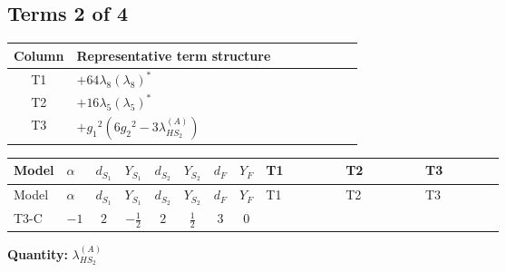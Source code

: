 \documentclass[8pt]{article}
\begin{document}
\begin{landscape}
\subsection*{Terms 2 of 4}
\begin{center}
\begin{tabular}{@{}c >{\raggedright\arraybackslash}p{0.82\linewidth}@{}}
\toprule
Column & Representative term structure \\
\midrule
T1 & \(\displaystyle +64 {\lambda_{8}} \left({\lambda_{8}}\right)^{*}\) \\
\midrule
T2 & \(\displaystyle +16 {\lambda_5} \left({\lambda_5}\right)^{*}\) \\
\midrule
T3 & \(\displaystyle +{g_1}^2 \left(6 {g_2}^2-3 {\lambda_{HS_2}^{(A)}}\right)\) \\
\midrule
\bottomrule
\end{tabular}
\end{center}
\smallskip
\tiny
\begin{longtable}{@{}llcccccc >{\raggedright\arraybackslash}p{0.21\linewidth} >{\raggedright\arraybackslash}p{0.21\linewidth} >{\raggedright\arraybackslash}p{0.21\linewidth}@{}}
\toprule
Model & $\alpha$ & $d_{S_1}$ & $Y_{S_1}$ & $d_{S_2}$ & $Y_{S_2}$ & $d_F$ & $Y_F$ & T1 & T2 & T3 \\
\midrule
\endfirsthead
\toprule
Model & $\alpha$ & $d_{S_1}$ & $Y_{S_1}$ & $d_{S_2}$ & $Y_{S_2}$ & $d_F$ & $Y_F$ & T1 & T2 & T3 \\
\midrule
\endhead
T3-C & $-1$ & $2$ & $-\frac{1}{2}$ & $2$ & $\frac{1}{2}$ & $3$ & $0$ & \scriptsize\adjustbox{max width=\linewidth}{$\begin{gathered} +64 {\lambda_{8}} \left({\lambda_{8}}\right)^{*}\end{gathered}$} & \scriptsize\adjustbox{max width=\linewidth}{$\begin{gathered} +16 {\lambda_5} \left({\lambda_5}\right)^{*}\end{gathered}$} & \scriptsize\adjustbox{max width=\linewidth}{$\begin{gathered} +{g_1}^2 \left(6 {g_2}^2-3 {\lambda_{HS_2}^{(A)}}\right)\end{gathered}$} \\
\midrule
\bottomrule
\end{longtable}
\clearpage
\noindent\textbf{Quantity: }$\lambda_{HS_2}^{(A)}$\par\smallskip

\end{landscape}
\end{document}
